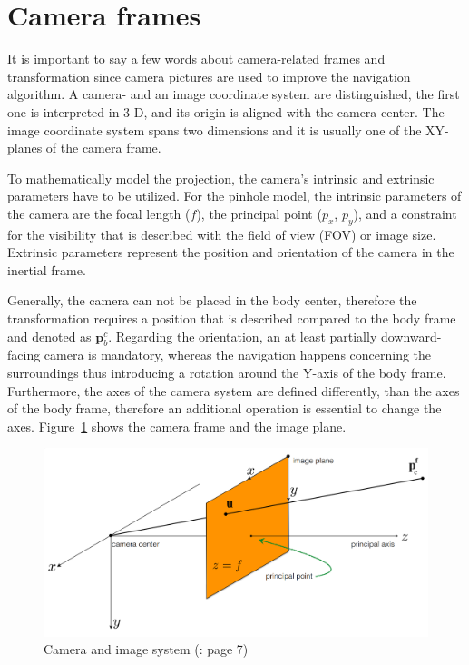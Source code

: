 \section{Camera frames}

It is important to say a few words about camera-related frames and transformation since camera pictures are used to improve the navigation algorithm. A camera- and an image coordinate system are distinguished, the first one is interpreted in 3-D, and its origin is aligned with the camera center. The image coordinate system spans two dimensions and it is usually one of the XY-planes of the camera frame. 

To mathematically model the projection, the camera's intrinsic and extrinsic parameters have to be utilized. For the pinhole model, the intrinsic parameters of the camera are the focal length ($f$), the principal point ($p_x$, $p_y$), and a constraint for the visibility that is described with the field of view (FOV) or image size. Extrinsic parameters represent the position and orientation of the camera in the inertial frame.

Generally, the camera can not be placed in the body center, therefore the transformation requires a position that is described compared to the body frame and denoted as $\mathbf{p}_{b}^c$. Regarding the orientation, an at least partially downward-facing camera is mandatory, whereas the navigation happens concerning the surroundings thus introducing a rotation around the Y-axis of the body frame. Furthermore, the axes of the camera system are defined differently, than the axes of the body frame, therefore an additional operation is essential to change the axes. Figure~\ref{fig:camera-system} shows the camera frame and the image plane. 

\begin{figure}[!ht]
    \centering
    \includegraphics[width=\textwidth]{figures/camera.png}
    \caption{Camera and image system (\cite{camera-matrix-slide}: page 7)}\label{fig:camera-system}
\end{figure}

